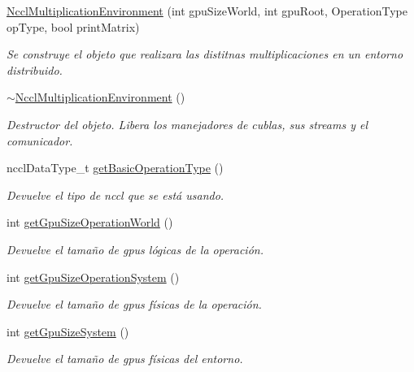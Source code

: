 \begin{DoxyCompactItemize}
\item 
\hyperlink{classNcclMultiplicationEnvironment_a3d263d7c05070aa5cadefdfbddb1ab1f}{Nccl\+Multiplication\+Environment} (int gpu\+Size\+World, int gpu\+Root, Operation\+Type op\+Type, bool print\+Matrix)
\begin{DoxyCompactList}\small\item\em Se construye el objeto que realizara las distitnas multiplicaciones en un entorno distribuido. \end{DoxyCompactList}\item 
\mbox{\label{classNcclMultiplicationEnvironment_a7a78ce37a42a5c2bc073d045c1644526}} 
\hyperlink{classNcclMultiplicationEnvironment_a7a78ce37a42a5c2bc073d045c1644526}{$\sim$\+Nccl\+Multiplication\+Environment} ()
\begin{DoxyCompactList}\small\item\em Destructor del objeto. Libera los manejadores de cublas, sus streams y el comunicador. \end{DoxyCompactList}\item 
nccl\+Data\+Type\+\_\+t \hyperlink{classNcclMultiplicationEnvironment_a6f985a18d27a9fd85196ec98d3108fa7}{get\+Basic\+Operation\+Type} ()
\begin{DoxyCompactList}\small\item\em Devuelve el tipo de nccl que se está usando. \end{DoxyCompactList}\item 
int \hyperlink{classNcclMultiplicationEnvironment_afc1a34dc8b7bed8073f57585fe04e6cf}{get\+Gpu\+Size\+Operation\+World} ()
\begin{DoxyCompactList}\small\item\em Devuelve el tamaño de gpus lógicas de la operación. \end{DoxyCompactList}\item 
int \hyperlink{classNcclMultiplicationEnvironment_a752d9bce3f46c935ccec9ffd964aa18c}{get\+Gpu\+Size\+Operation\+System} ()
\begin{DoxyCompactList}\small\item\em Devuelve el tamaño de gpus físicas de la operación. \end{DoxyCompactList}\item 
int \hyperlink{classNcclMultiplicationEnvironment_a112bdda6a9f28753784e4d43d84644a2}{get\+Gpu\+Size\+System} ()
\begin{DoxyCompactList}\small\item\em Devuelve el tamaño de gpus físicas del entorno. \end{DoxyCompactList}\item 

\end{DoxyCompactItemize}
